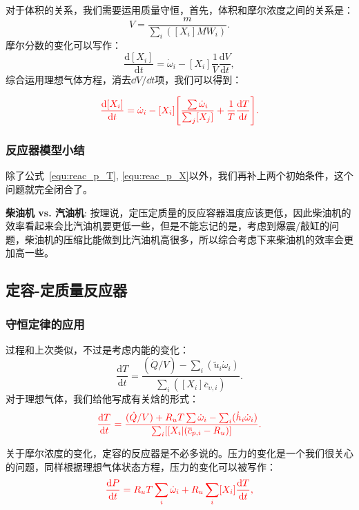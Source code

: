对于体积的关系，我们需要运用质量守恒，首先，体积和摩尔浓度之间的关系是：
\begin{equation}
    V={\frac{m}{\sum_{i}([X_{i}]M W_{i})}}.
\end{equation}
摩尔分数的变化可以写作：
\begin{equation}
    {\frac{\mathrm{d}[X_{i}]}{\mathrm{d}t}}={\dot{\omega}}_{i}-[X_{i}]{\frac{1}{V}}{\frac{\mathrm{d}V}{\mathrm{d}t}},
\end{equation}
综合运用理想气体方程，消去\(\dd V/\dd t\)项，我们可以得到：

\begin{equation}\color{red}\label{equ:reac_p_X}
    {\frac{\mathrm{d}[X_{i}]}{\mathrm{d}t}}={\dot{\omega}}_{i}-[X_{i}]{\Biggl[}{\frac{\sum{\dot{\omega}}_{i}}{\sum_j [X_j]}}+{\frac{1}{T}}{\frac{\mathrm{d}T}{\mathrm{d}t}}{\Biggr]}.
\end{equation}

\subsubsection{反应器模型小结}

除了公式~\ref{equ:reac_p_T}, \ref{equ:reac_p_X}以外，我们再补上两个初始条件，这个问题就完全闭合了。

\textbf{柴油机 vs. 汽油机}: 按理说，定压定质量的反应容器温度应该更低，因此柴油机的效率看起来会比汽油机要更低一些，但是不能忘记的是，考虑到爆震/敲缸的问题，柴油机的压缩比能做到比汽油机高很多，所以综合考虑下来柴油机的效率会更加高一些。

\subsection{定容-定质量反应器}
\subsubsection{守恒定律的应用}
过程和上次类似，不过是考虑内能的变化：
\[
    \frac{\mathrm{d}T}{\mathrm{d}t}=\frac{({\dot{Q}}/V)-\sum_i({\tilde{u}}_{i}{\dot{\omega}}_{i})}{\sum_{i}([X_{i}]{\overline{{{c}}}}_{\upsilon,i})}.
\]
对于理想气体，我们给他写成有关焓的形式：
\begin{equation}\color{red}\label{equ:reac_v_T}
    {\frac{\mathrm{d}T}{\mathrm{d}t}}={\frac{({\dot{Q}}/V)+R_{u}T\sum{\dot{\omega}}_{i}-\sum_{i}({\dot{h}}_{i}{\dot{\omega}}_{i})}{\sum_{i}[\left[X_{i}|({\overline{{c}}}_{p,i}-R_{u})\right]}}.
\end{equation}

关于摩尔浓度的变化，定容的反应器是不必多说的。压力的变化是一个我们很关心的问题，同样根据理想气体状态方程，压力的变化可以被写作：
\begin{equation}\color{red}\label{equ:reac_v_P}
    {\frac{\mathrm{d}P}{\mathrm{d}t}}=R_{u}T\sum_{i}{\dot{\omega}}_{i}+R_{u}\sum_{i}[X_{i}]{\frac{\mathrm{d}T}{\mathrm{d}t}},
\end{equation}

